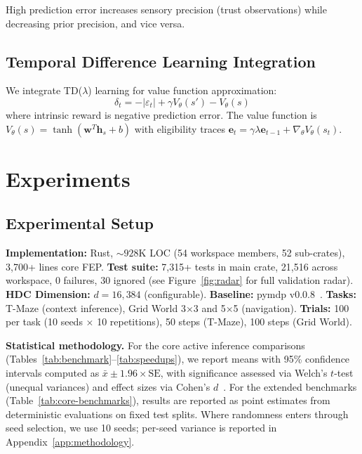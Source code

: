 \documentclass[10pt,letterpaper]{article}
\newcommand{\hvec}[1]{\mathbf{h}_{#1}}
\begin{document}
High prediction error increases sensory precision (trust observations) while decreasing prior precision, and vice versa.

\subsection{Temporal Difference Learning Integration}

We integrate TD($\lambda$) learning for value function approximation:
\begin{equation}
\delta_t = -|\varepsilon_t| + \gamma V_\theta(s') - V_\theta(s)
\end{equation}
where intrinsic reward is negative prediction error. The value function is $V_\theta(s) = \tanh(\mathbf{w}^T \hvec{s} + b)$ with eligibility traces $\mathbf{e}_t = \gamma\lambda\mathbf{e}_{t-1} + \nabla_\theta V_\theta(s_t)$.

\section{Experiments}

\subsection{Experimental Setup}

\textbf{Implementation:} Rust, ${\sim}928$K LOC (54 workspace members, 52 sub-crates), 3,700+ lines core FEP.
\textbf{Test suite:} 7,315+ tests in main crate, 21,516 across workspace, 0 failures, 30 ignored (see Figure~\ref{fig:radar} for full validation radar).
\textbf{HDC Dimension:} $d = 16{,}384$ (configurable).
\textbf{Baseline:} pymdp v0.0.8~\cite{heins2022pymdp}.
\textbf{Tasks:} T-Maze (context inference), Grid World 3$\times$3 and 5$\times$5 (navigation).
\textbf{Trials:} 100 per task (10 seeds $\times$ 10 repetitions), 50 steps (T-Maze), 100 steps (Grid World).

\textbf{Statistical methodology.}
For the core active inference comparisons (Tables~\ref{tab:benchmark}--\ref{tab:speedups}), we report means with 95\% confidence intervals computed as $\bar{x} \pm 1.96 \times \mathrm{SE}$, with significance assessed via Welch's $t$-test (unequal variances) and effect sizes via Cohen's $d$~\cite{cohen1988statistical}.
For the extended benchmarks (Table~\ref{tab:core-benchmarks}), results are reported as point estimates from deterministic evaluations on fixed test splits.
Where randomness enters through seed selection, we use 10 seeds; per-seed variance is reported in Appendix~\ref{app:methodology}.
\end{document}
